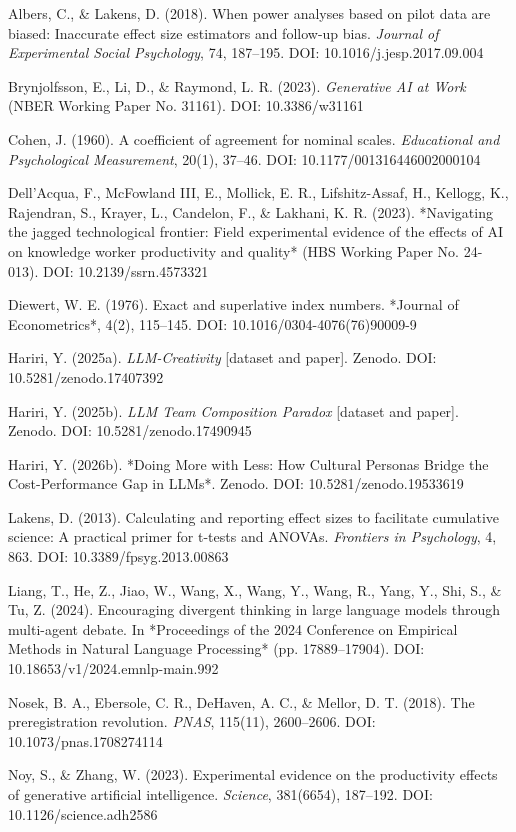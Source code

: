 \documentclass[11pt,a4paper]{article}
\begin{document}
Albers, C., \& Lakens, D. (2018). When power analyses based on pilot data
are biased: Inaccurate effect size estimators and follow-up bias.
\textit{Journal of Experimental Social Psychology}, 74, 187–195.
DOI: 10.1016/j.jesp.2017.09.004

Brynjolfsson, E., Li, D., \& Raymond, L. R. (2023). \textit{Generative AI at Work}
(NBER Working Paper No. 31161). DOI: 10.3386/w31161

Cohen, J. (1960). A coefficient of agreement for nominal scales.
\textit{Educational and Psychological Measurement}, 20(1), 37–46.
DOI: 10.1177/001316446002000104

Dell'Acqua, F., McFowland III, E., Mollick, E. R., Lifshitz-Assaf, H.,
Kellogg, K., Rajendran, S., Krayer, L., Candelon, F., \& Lakhani, K. R.
(2023). *Navigating the jagged technological frontier: Field experimental
evidence of the effects of AI on knowledge worker productivity and quality*
(HBS Working Paper No. 24-013). DOI: 10.2139/ssrn.4573321

Diewert, W. E. (1976). Exact and superlative index numbers. *Journal of
Econometrics*, 4(2), 115–145. DOI: 10.1016/0304-4076(76)90009-9

Hariri, Y. (2025a). \textit{LLM-Creativity} [dataset and paper]. Zenodo.
DOI: 10.5281/zenodo.17407392

Hariri, Y. (2025b). \textit{LLM Team Composition Paradox} [dataset and paper].
Zenodo. DOI: 10.5281/zenodo.17490945

Hariri, Y. (2026b). *Doing More with Less: How Cultural Personas Bridge the
Cost-Performance Gap in LLMs*. Zenodo. DOI: 10.5281/zenodo.19533619

Lakens, D. (2013). Calculating and reporting effect sizes to facilitate
cumulative science: A practical primer for t-tests and ANOVAs.
\textit{Frontiers in Psychology}, 4, 863.
DOI: 10.3389/fpsyg.2013.00863

Liang, T., He, Z., Jiao, W., Wang, X., Wang, Y., Wang, R., Yang, Y.,
Shi, S., \& Tu, Z. (2024). Encouraging divergent thinking in large language
models through multi-agent debate. In *Proceedings of the 2024 Conference on
Empirical Methods in Natural Language Processing* (pp. 17889–17904).
DOI: 10.18653/v1/2024.emnlp-main.992

Nosek, B. A., Ebersole, C. R., DeHaven, A. C., \& Mellor, D. T. (2018). The
preregistration revolution. \textit{PNAS}, 115(11), 2600–2606.
DOI: 10.1073/pnas.1708274114

Noy, S., \& Zhang, W. (2023). Experimental evidence on the productivity
effects of generative artificial intelligence. \textit{Science}, 381(6654),
187–192. DOI: 10.1126/science.adh2586
\end{document}

